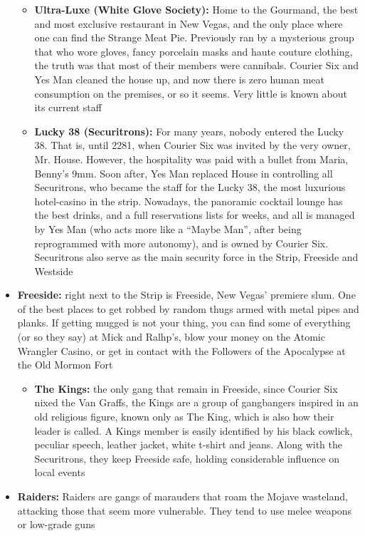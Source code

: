 \documentclass[11pt]{article} %
\begin{document}
\begin{itemize}
\begin{itemize}
\item \textbf{Ultra-Luxe (White Glove Society):} Home to the Gourmand, the best and most exclusive restaurant in New Vegas, and the only place where one can find the Strange Meat Pie. Previously ran by a mysterious group that who wore gloves, fancy porcelain masks and haute couture clothing, the truth was that most of their members were cannibals. Courier Six and Yes Man cleaned the house up, and now there is zero human meat consumption on the premises, or so it seems. Very little is known about its current staff

\item \textbf{Lucky 38 (Securitrons):} For many years, nobody entered the Lucky 38. That is, until 2281, when Courier Six was invited by the very owner, Mr. House. However, the hospitality was paid with a bullet from Maria, Benny's 9mm. Soon after, Yes Man replaced House in controlling all Securitrons, who became the staff for the Lucky 38, the most luxurious hotel-casino in the strip. Nowadays, the panoramic cocktail lounge has the best drinks, and a full reservations lists for weeks, and all is managed by Yes Man (who acts more like a ``Maybe Man'', after being reprogrammed with more autonomy), and is owned by Courier Six. Securitrons also serve as the main security force in the Strip, Freeside and Westside
\end{itemize} 

\item \textbf{Freeside:} right next to the Strip is Freeside, New Vegas' premiere slum. One of the best places to get robbed by random thugs armed with metal pipes and planks. If getting mugged is not your thing, you can find some of everything (or so they say) at Mick and Ralhp's, blow your money on the Atomic Wrangler Casino, or get in contact with the Followers of the Apocalypse at the Old Mormon Fort

\begin{itemize}
\item \textbf{The Kings:} the only gang that remain in Freeside, since Courier Six nixed the Van Graffs, the Kings are a group of gangbangers inspired in an old religious figure, known only as The King, which is also how their leader is called. A Kings member is easily identified by his black cowlick, peculiar speech, leather jacket, white t-shirt and jeans. Along with the Securitrons, they keep Freeside safe, holding considerable influence on local events
\end{itemize}

\item \textbf{Raiders:} Raiders are gangs of marauders that roam the Mojave wasteland, attacking those that seem more vulnerable. They tend to use melee weapons or low-grade guns


\end{itemize}
\end{document}
